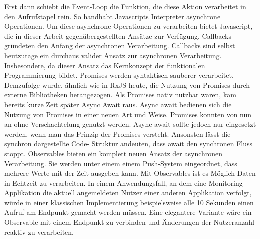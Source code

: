 \noindent
Erst dann schiebt die Event-Loop die Funktion, die diese Aktion verarbeitet in den Aufrufstapel rein. So handhabt Javascripts Interpreter asynchrone Operationen. Um diese asynchrone Operationen zu verarbeiten bietet Javascript, die in dieser Arbeit gegenübergestellten Ansätze zur Verfügung. Callbacks gründeten den Anfang der asynchronen Verarbeitung. Callbacks sind selbst heutzutage ein durchaus valider Ansatz zur asynchronen Verarbeitung. Insbesondere, da dieser Ansatz das Kernkonzept der funktionalen Programmierung bildet. Promises werden syntaktisch \glqq sauberer\grqq{} verarbeitet. Demzufolge wurde, ähnlich wie in RxJS heute, die Nutzung von Promises durch externe Bibliotheken herangezogen. Als Promises nativ nutzbar waren, kam bereits kurze Zeit später Async Await raus. Async await bedienen sich die Nutzung von Promises in einer neuen Art und Weise. Promises konnten von nun an ohne Verschachtelung genutzt werden. Async await sollte jedoch nur eingesetzt werden, wenn man das Prinzip der Promises versteht. Ansonsten lässt die synchron dargestellte Code- Struktur andeuten, dass await den synchronen Fluss stoppt. Observables bieten ein komplett neuen Ansatz der asynchronen Verarbeitung. Sie werden unter einem einem Push-System eingeordnet, dass mehrere Werte mit der Zeit ausgeben kann. Mit Observables ist es Möglich Daten in Echtzeit zu verarbeiten. In einem Anwendungsfall, an dem eine Monitoring Applikation die aktuell angemeldeten Nutzer einer anderen Applikation verfolgt, würde in einer klassischen Implementierung beispielsweise alle 10 Sekunden einen Aufruf am Endpunkt gemacht werden müssen. Eine elegantere Variante wäre ein Observable mit einem Endpunkt zu verbinden und Änderungen der Nutzeranzahl reaktiv  zu verarbeiten.
